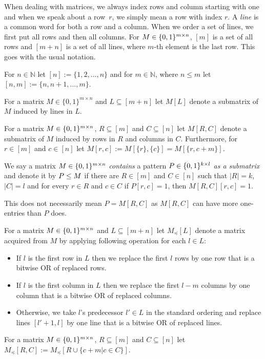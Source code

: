 When dealing with matrices, we always index rows and column starting with one and when we speak about a row~$r$, we simply mean a row with index $r$. A \emph{line} is a common word for both a row and a column. When we order a set of lines, we first put all rows and then all columns. For $M\in\{0,1\}^{m\times n}$, $[m]$ is a set of all rows and $[m+n]$ is a set of all lines, where $m$-th element is the last row. This goes with the usual notation.
\begin{ntn}
For $n\in\mathbb{N}$ let $[n]:=\{1,2,\dots,n\}$ and for $m\in\mathbb{N}$, where $n\leq m$ let $[n,m]:=\{n,n+1,\dots,m\}$.
\end{ntn}
\begin{ntn}
For a matrix $M\in\{0,1\}^{m\times n}$ and $L\subseteq[m+n]$ let $M[L]$ denote a submatrix of $M$ induced by lines in $L$.
\end{ntn}
\begin{ntn}
For a matrix $M\in\{0,1\}^{m\times n}$, $R\subseteq[m]$ and $C\subseteq[n]$ let $M[R,C]$ denote a submatrix of $M$ induced by rows in $R$ and columns in $C$. Furthermore, for $r\in[m]$ and $c\in[n]$ let $M[r,c]:=M[\{r\},\{c\}]=M[\{r,c+m\}]$.
\end{ntn}
\begin{defn}
We say a matrix $M\in\{0,1\}^{m\times n}$ \emph{contains} a pattern $P\in\{0,1\}^{k\times l}$ \emph{as a submatrix} and denote it by $P\leq M$ if there are $R\in[m]$ and $C\in[n]$ such that $|R|=k$, $|C|=l$ and for every $r\in R$ and $c\in C$ if $P[r,c]=1$, then $M[R,C][r,c]=1$.
\end{defn}
This does not necessarily mean $P=M[R,C]$ as $M[R,C]$ can have more one-entries than $P$ does.
\begin{ntn}
For a matrix $M\in\{0,1\}^{m\times n}$ and $L\subseteq[m+n]$ let $M_{\preceq}[L]$ denote a matrix acquired from $M$ by applying following operation for each $l\in L$:
\begin{itemize}
\item If $l$ is the first row in $L$ then we replace the first $l$ rows by one row that is a bitwise OR of replaced rows.
\item If $l$ is the first column in $L$ then we replace the first $l-m$ columns by one column that is a bitwise OR of replaced columns.
\item Otherwise, we take $l$'s predecessor $l'\in L$ in the standard ordering and replace lines $[l'+1,l]$ by one line that is a bitwise OR of replaced lines.
\end{itemize}
\end{ntn}
\begin{ntn}
For a matrix $M\in\{0,1\}^{m\times n}$, $R\subseteq[m]$ and $C\subseteq[n]$ let $M_{\preceq}[R,C]:=M_{\preceq}[R\cup \{c+m|c\in C\}]$.
\end{ntn}
